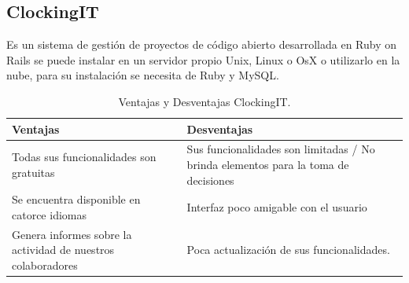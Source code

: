 \subsection{ClockingIT}  
Es un sistema de gestión de proyectos de código abierto desarrollada en Ruby on Rails se puede instalar en un servidor propio Unix, Linux o OsX o utilizarlo en la nube, para su instalación se necesita de Ruby y MySQL.\cite{E. Simonsen}
\newline \newline
\begin{table}[htbp]
\begin{center}
\begin{tabular}{|p{85mm}|p{85mm}|}
\hline
Ventajas & Desventajas 
\\
\hline \hline
Todas sus funcionalidades son gratuitas & Sus funcionalidades son limitadas / No brinda elementos para la toma de decisiones 
\\ \hline
Se encuentra disponible en catorce idiomas & Interfaz poco amigable con el usuario 

\\ \hline
Genera informes sobre la actividad de nuestros colaboradores & Poca actualización de sus funcionalidades. 
\\ \hline
\end{tabular}
\caption{Ventajas y Desventajas ClockingIT.}
\label{tabla:ventajas}
\end{center}
\end{table}

